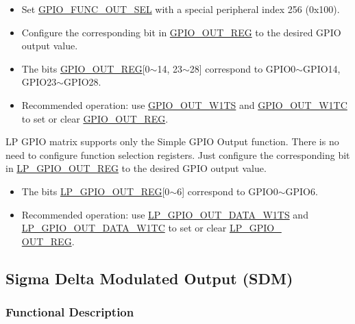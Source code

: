 \documentclass[main\_\_EN.tex]{subfiles}
\begin{document}
\begin{itemize}
    \item Set \hyperref[fielddesc:GPIOFUNCNOUTSEL]{GPIO\_FUNC\_OUT\_SEL} with a special peripheral index 256 (0x100).
    \item Configure the corresponding bit in \hyperref[regdesc:GPIOOUTREG]{GPIO\_OUT\_REG} to the desired GPIO output value.
\end{itemize}

\begin{tiplisting}
\vspace{-2em}
\begin{itemize}
\item The bits \hyperref[regdesc:GPIOOUTREG]{GPIO\_OUT\_REG}[0$\sim$14, 23$\sim$28] correspond to GPIO0$\sim$GPIO14, GPIO23$\sim$GPIO28.
\item Recommended operation: use \hyperref[fielddesc:GPIOOUTW1TS]{GPIO\_OUT\_W1TS} and \hyperref[fielddesc:GPIOOUTW1TC]{GPIO\_OUT\_W1TC} to set or clear \hyperref[regdesc:GPIOOUTREG]{GPIO\_OUT\_REG}.
\end{itemize}
\end{tiplisting}

LP GPIO matrix supports only the Simple GPIO Output function. There is no need to configure function selection registers. Just configure the corresponding bit in \hyperref[regdesc:LPGPIOOUTREG]{LP\_GPIO\_OUT\_REG} to the desired GPIO output value.
\begin{tiplisting}
\vspace{-2em}
\begin{itemize}
    \item The bits \hyperref[regdesc:LPGPIOOUTREG]{LP\_GPIO\_OUT\_REG}[0$\sim$6] correspond to GPIO0$\sim$GPIO6.
    \item Recommended operation: use \hyperref[fielddesc:LPGPIOOUTW1TS]{LP\_GPIO\_OUT\_DATA\_W1TS} and \hyperref[fielddesc:LPGPIOOUTW1TC]{LP\_GPIO\_OUT\_DATA\_W1TC} to set or clear \hyperref[regdesc:LPGPIOOUTREG]{LP\_GPIO\_\\OUT\_REG}.
\end{itemize}
\end{tiplisting}

\subsection{Sigma Delta Modulated Output (SDM)}

\subsubsection{Functional Description}
\end{document}
